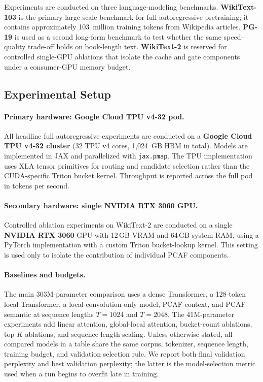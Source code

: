 \documentclass{article}
\begin{document}
Experiments are conducted on three language-modeling benchmarks.
\textbf{WikiText-103} \citep{merity2016pointer} is the primary large-scale
benchmark for full autoregressive pretraining; it contains approximately
103~million training tokens from Wikipedia articles. \textbf{PG-19} is used as
a second long-form benchmark to test whether the same speed--quality trade-off
holds on book-length text. \textbf{WikiText-2} \citep{merity2016pointer} is
reserved for controlled single-GPU ablations that isolate the cache and gate
components under a consumer-GPU memory budget.

\subsection{Experimental Setup}

\paragraph{Primary hardware: Google Cloud TPU v4-32 pod.}
All headline full autoregressive experiments are conducted on a
\textbf{Google Cloud TPU v4-32 cluster} (32 TPU v4 cores, 1,024~GB HBM in
total). Models are implemented in JAX and parallelized with \texttt{jax.pmap}.
The TPU implementation uses XLA tensor primitives for routing and candidate
selection rather than the CUDA-specific Triton bucket kernel. Throughput is
reported across the full pod in tokens per second.

\paragraph{Secondary hardware: single NVIDIA RTX 3060 GPU.}
Controlled ablation experiments on WikiText-2 are conducted on a single
\textbf{NVIDIA RTX 3060} GPU with 12\,GB VRAM and 64\,GB system RAM, using a
PyTorch implementation with a custom Triton bucket-lookup kernel. This setting
is used only to isolate the contribution of individual PCAF components.

\paragraph{Baselines and budgets.}
The main 303M-parameter comparison uses a dense Transformer, a 128-token local
Transformer, a local-convolution-only model, PCAF-context, and PCAF-semantic at
sequence lengths $T{=}1024$ and $T{=}2048$. The 41M-parameter experiments add
linear attention, global-local attention, bucket-count ablations, top-$K$
ablations, and sequence length scaling. Unless otherwise stated, all compared
models in a table share the same corpus, tokenizer, sequence length, training
budget, and validation selection rule. We report both final validation
perplexity and best validation perplexity; the latter is the model-selection
metric used when a run begins to overfit late in training.
\end{document}
